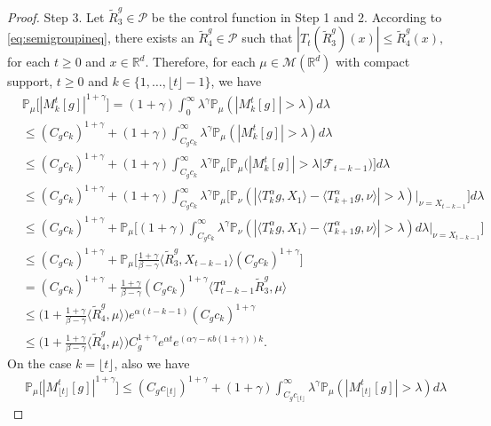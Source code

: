 \documentclass[12pt,oneside,english]{amsart}
\theoremstyle{plain}
\theoremstyle{definition}
\numberwithin{equation}{section}
\begin{document}
{\begin{proof}
    Step 3.
    Let $\tilde R^g_3\in \mathcal P$ be the control function in Step 1 and 2. According to \eqref{eq:semigroupineq}, there exists an $\tilde R^g_4\in \mathcal P$ such that
$
    |T_t(\tilde R^g_3)(x)|
    \leq \tilde R^g_4(x),
$
    for each $t\geq 0$ and $x\in \mathbb{R}^d$.
    Therefore, for each $\mu \in \mathcal M(\mathbb R^d)$ with compact support, $t\geq 0$ and $k \in \{1,\dots,\lfloor t \rfloor-1\}$, we have
\begin{align}
    &\mathbb P_\mu\big[|M_k^t[g]|^{1+\gamma}\big] = (1+\gamma)\int_0^\infty \lambda^{\gamma} \mathbb P_{\mu}(|M_k^t[g]|>\lambda) d\lambda
    \\&\leq (C_g c_k)^{1+\gamma}+(1+\gamma)\int_{C_g c_k}^\infty \lambda^{\gamma}\mathbb P_\mu(|M_k^t[g]|> \lambda) d\lambda
    \\&\leq (C_g c_k)^{1+\gamma}+(1+\gamma)\int_{C_g c_k}^\infty \lambda^{\gamma}\mathbb P_\mu \big[\mathbb P_\mu\big(|M_k^t[g]|> \lambda\big| \mathscr F_{t-k-1}\big)\big] d\lambda
    \\&\leq (C_g c_k)^{1+\gamma}+(1+\gamma)\int_{C_g c_k}^\infty \lambda^{\gamma}\mathbb P_\mu \big[\mathbb P_\nu(|\langle T_k^\alpha g,X_1\rangle - \langle T_{k+1}^\alpha g, \nu\rangle|> \lambda)\big|_{\nu=X_{t-k-1}}\big] d\lambda
    \\&\leq (C_g c_k)^{1+\gamma}+\mathbb P_\mu\Big[(1+\gamma)\int_{C_g c_k}^\infty \lambda^{\gamma} \mathbb P_\nu(|\langle T_k^\alpha g,X_1\rangle - \langle T_{k+1}^\alpha g, \nu\rangle|> \lambda) d\lambda\Big|_{\nu=X_{t-k-1}}\Big]
    \\&\leq (C_g c_k)^{1+\gamma}+\mathbb P_\mu\Big[\frac{1+\gamma}{\beta- \gamma}\langle \tilde R^g_3,X_{t-k-1}\rangle (C_g c_k)^{1+\gamma}\Big]
    \\&= (C_g c_k)^{1+\gamma}+\frac{1+\gamma}{\beta- \gamma}(C_g c_k)^{1+\gamma} \langle T_{t-k-1}^{\alpha}\tilde R^g_3,\mu\rangle
    \\&\leq \Big(1+ \frac{1+\gamma}{\beta - \gamma} \langle \tilde R^g_4,\mu\rangle\Big) e^{\alpha(t-k-1)}(C_g c_k)^{1+\gamma}
    \\&\leq \Big(1+ \frac{1+\gamma}{\beta - \gamma} \langle \tilde R^g_4,\mu\rangle\Big) C_g^{1+\gamma}e^{\alpha t}e^{(\alpha \gamma - \kappa b(1+\gamma))k}.
\end{align}
On the case $k=\lfloor t \rfloor$, also we have
\begin{align}
     &\mathbb P_\mu\big[|M_{\lfloor t \rfloor}^t[g]|^{1+\gamma}\big]\leq (C_g c_{\lfloor t \rfloor})^{1+\gamma}+(1+\gamma)\int_{C_g c_{\lfloor t \rfloor}}^\infty \lambda^{\gamma}\mathbb P_\mu(|M_{\lfloor t \rfloor}^t[g]|> \lambda) d\lambda

\end{align}
\end{proof}}
\end{document}
